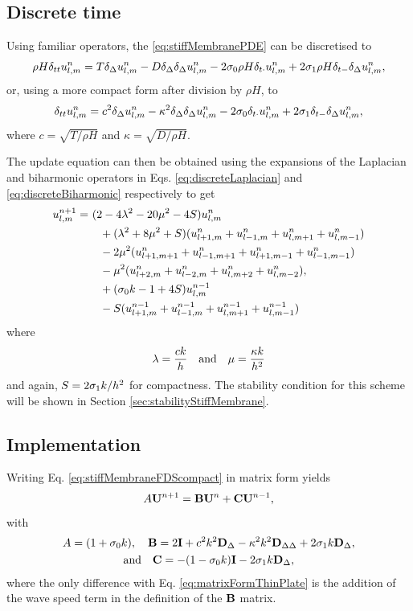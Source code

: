 {\subsection{Discrete time}
Using familiar operators, the \eqref{eq:stiffMembranePDE} can be discretised to 
\begin{equation}\label{eq:stiffMembraneFDS}
    \rho H \delta_{tt} u_{l,m}^n = T\delta_{\Delta}u_{l,m}^n- D \delta_{\Delta}\delta_{\Delta}u_{l,m}^n - 2\sigma_{0} \rho H \delta_{t\cdot} u_{l,m}^n + 2 \sigma_{1} \rho H \delta_{t-} \delta_{\Delta}u_{l,m}^n,
\end{equation}
or, using a more compact form after division by $\rho H$, to
\begin{equation}\label{eq:stiffMembraneFDScompact}
    \delta_{tt} u_{l,m}^n = c^2\delta_{\Delta}u_{l,m}^n- \kappa^2 \delta_{\Delta}\delta_{\Delta}u_{l,m}^n - 2\sigma_{0} \delta_{t\cdot} u_{l,m}^n + 2 \sigma_{1} \delta_{t-} \delta_{\Delta}u_{l,m}^n,
\end{equation}
where $c = \sqrt{T / \rho H}$ and $\kappa = \sqrt{D / \rho H}$.

The update equation can then be obtained using the expansions of the Laplacian and biharmonic operators in Eqs. \eqref{eq:discreteLaplacian} and \eqref{eq:discreteBiharmonic} respectively to get
\begin{equation}\label{eq:stiffMembraneUpdate}
    \begin{aligned}
    u_{l,m}^{n+1} =&\ (2 - 4\lambda^2 - 20\mu^2 - 4S)u_{l,m}^n \\
    &\ \ \ +(\lambda^2 + 8\mu^2 + S)(u_{l+1, m}^n + u_{l-1, m}^n+u_{l, m+1}^n+u_{l, m-1}^n)\\
    &\ \ \ -2\mu^2(u_{l+1, m+1}^n + u_{l-1, m+1}^n+u_{l+1, m-1}^n+u_{l-1, m-1}^n)\\
    &\ \ \ -\mu^2(u_{l+2, m}^n + u_{l-2, m}^n+u_{l, m+2}^n+u_{l, m-2}^n),\\
    &\ \ \ + (\sigma_{0} k  - 1 + 4S) u_{l,m}^{n-1}\\
    &\ \ \ - S (u_{l+1, m}^{n-1} + u_{l-1, m}^{n-1}+u_{l, m+1}^{n-1}+u_{l, m-1}^{n-1})
    \end{aligned}
\end{equation}
where 
\begin{equation}\label{eq:lambdaMuStiffMembrane}
    \lambda = \frac{c k}{h}\quad \text{and} \quad \mu = \frac{\kappa k}{h^2}
\end{equation}
and again, $S = 2\sigma_{1} k / h^2$ for compactness. The stability condition for this scheme will be shown in Section \ref{sec:stabilityStiffMembrane}.

\subsection{Implementation}
Writing  Eq. \eqref{eq:stiffMembraneFDScompact} in matrix form yields 
\begin{equation}
    A\mathbf{U}^{n+1} = \mathbf{B}\mathbf{U}^n + \mathbf{C}\mathbf{U}^{n-1},
\end{equation}
with
\begin{gather*}
    A = (1+\sigma_{0} k),\quad \mathbf{B} = 2\mathbf{I} + c^2k^2 \mathbf{D}_\Delta - \kappa^2 k^2 \mathbf{D}_{\Delta\Delta} + 2 \sigma_{1} k\mathbf{D}_\Delta, \\
    \text{and}\quad \mathbf{C} = -(1-\sigma_{0} k)\mathbf{I} - 2\sigma_{1} k \mathbf{D}_\Delta,
\end{gather*}
where the only difference with Eq. \eqref{eq:matrixFormThinPlate} is the addition of the wave speed term in the definition of the $\mathbf{B}$ matrix. 

}
